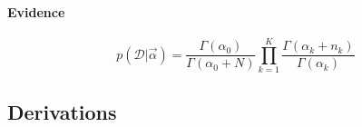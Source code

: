 \paragraph{Evidence}
    \begin{equation}
        p(\mathcal D | \vec\alpha) = \frac{\Gamma(\alpha_0)}{\Gamma(\alpha_0 + N)} \prod_{k = 1}^K \frac{\Gamma(\alpha_k + n_k)}{\Gamma(\alpha_k)}
    \end{equation}

\subsection{Derivations}